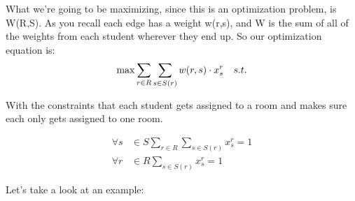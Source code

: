 \documentclass[12pt]{article}
\begin{document}
What we're going to be maximizing, since this is an optimization problem, is W(R,S). As you recall each edge has a weight w(r,s), and W is the sum of all of the weights from each student wherever they end up. So our optimization equation is:\\

\begin{equation*}
\max\sum_{r\in{R}}\sum_{s\in{S(r)}}w(r,s)\cdot{x_s^r}\quad{s.t.}\\
\end{equation*}

With the constraints that each student gets assigned to a room and makes sure each only gets assigned to one room.

\begin{align*}
\forall{s}&\in{S}\sum_{r\in{R}}\sum_{s\in{S(r)}}x_s^r=1\\
\forall{r}&\in{R}\sum_{s\in{S(r)}}x_s^r=1
\end{align*}

Let's take a look at an example:\\
\end{document}
